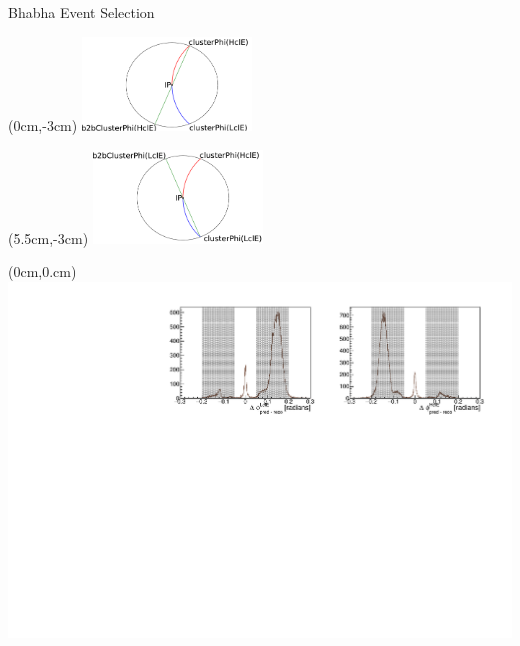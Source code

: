 \documentclass[8pt]{beamer}
\begin{document}
\begin{frame}{Bhabha Event Selection}
	
	\begin{textblock*}{0.5\textwidth}(0cm,-3cm)
		\centering
		\includegraphics[width=4.5cm]{VBilder/b2b_2}
	\end{textblock*}
	
	\begin{textblock*}{0.5\textwidth}(5.5cm,-3cm)
		\centering
		\includegraphics[width=4.5cm]{VBilder/b2b_3}
	\end{textblock*}
	
	
	\begin{textblock*}{1\textwidth}(0cm,0.cm)
		\centering
		\includegraphics[width=\textwidth]{VBilder/sb2b_Data.pdf}
	\end{textblock*}
	
	
\pause	
	

\end{frame}
\end{document}
